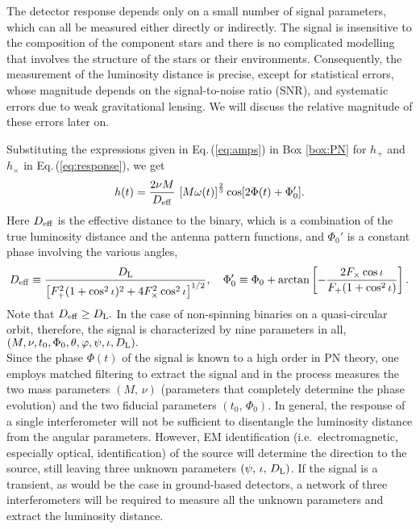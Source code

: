The detector response depends only on a
small number of signal parameters, which can all be measured
either directly or indirectly. The signal is insensitive to
the composition of the component stars and there is
no complicated modelling that involves the structure of the
stars or their environments. Consequently, the measurement
of the luminosity distance is precise, except 
for statistical errors, whose magnitude depends
on the signal-to-noise ratio (SNR), and systematic
errors due to weak gravitational lensing. We will discuss
the relative magnitude of these errors later on.

{Substituting the expressions given in Eq.\,(\ref{eq:amps}) in Box \ref{box:PN}
for $h_+$ and $h_\times$ in Eq.\,(\ref{eq:response}), we get
\begin{equation}
h(t) = \frac{2\nu M}{D_{\rm eff}}\, \left [ M\omega(t)\right]^{\frac{2}{3}} \cos[2\Phi(t) + \Phi_0'].
\label{eq:response1}
\end{equation}
Here $D_{\rm eff}$ is the effective distance to the binary, which
is a combination of the true luminosity distance and 
the antenna pattern functions, and $\Phi_0'$ is a constant phase
involving the various angles,
\begin{equation}
D_{\rm eff} \equiv \frac{D_{\rm L}}{ \left [ F_+^2 (1+\cos^2\iota)^2 +
       4 F_\times^2 \cos^2\iota \right ]^{1/2}}, \quad
\Phi_0' \equiv \Phi_0 + \arctan \left [-\frac{2 F_\times\cos\iota }{F_+ (1+\cos^2\iota)}\right ].
\label{eq:response2}
\end{equation}
Note that $D_{\rm eff} \ge D_{\rm L}.$
In the case of non-spinning binaries on a quasi-circular orbit,
therefore, the signal is characterized by nine parameters in all, 
$(M, \nu, t_0, \Phi_0, \theta, \varphi, \psi, \iota, D_{\rm L}).$
\\[10pt]\indent
Since the phase $\Phi(t)$ of the signal is known 
to a high order in PN theory, one employs matched filtering to 
extract the signal and in the process measures the two mass 
parameters $(M,\, \nu)$ (parameters that completely determine 
the phase evolution) and the two fiducial parameters $(t_0,\, \Phi_0).$
In general, the response of a single interferometer will not be 
sufficient to disentangle the luminosity distance from the angular 
parameters. However, EM identification (i.e.\ electromagnetic, 
especially optical, identification) of the source will determine
the direction to the source, still leaving three unknown parameters
$(\psi,\, \iota,\, D_{\rm L})$. If the signal is a transient, as 
would be the case in ground-based detectors, a network of three 
interferometers will be required to measure all the unknown 
parameters and extract the luminosity distance.}

